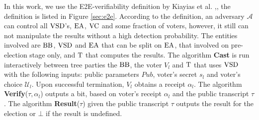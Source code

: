  In this work, we use the E2E-verifiability definition by Kiayias et al. \cite{Kiayias2015a},\cite{Kiayias2015}, the definition is listed in Figure \ref{sec:e2e}. 
According to the definition, an adversary $\mathcal{A}$ can control all $\operatorname{VSD}$'s, $\operatorname{EA}$, $\operatorname{VC}$ and some fraction of voters, however, it still can not manipulate the results without a high detection probability.  The entities involved are $\operatorname{BB}$, $\operatorname{VSD}$ and $\operatorname{EA}$ that can be split on $\operatorname{EA}$, that involved on pre-election stage only, and $\operatorname{T}$ that computes the results. The algorithm \textbf{Cast} is run interactively between tree parties the $\operatorname{BB}$, the voter $V_l$ and $\operatorname{T}$ that uses $\operatorname{VSD}$ with the following inputs: public parameters $Pub$, voter's secret $s_l$ and voter's choice $\mathcal{U}_l$. Upon successful termination, $V_l$ obtains a receipt $\alpha_l$. The algorithm \textbf{Verify}($\tau,\alpha_l$) outputs a bit, based on voter's receipt $\alpha_l$ and the public transcript $\tau$. The algorithm \textbf{Result}($\tau$) given the public transcript $\tau$  outputs the result for the election or $\bot$ if the result is undefined.\\
